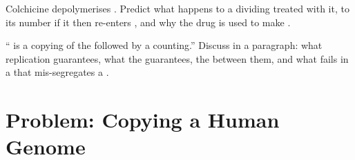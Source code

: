 \begin{exercise}[$\star\star\star$]\label{exo:b1:replication-mitosis:11}
Colchicine depolymerises . Predict what happens to a
dividing  treated with it, to its  number if it then
re-enters , and why the drug is used to make .
\end{exercise}

\begin{exercise}[$\star\star\star$]\label{exo:b1:replication-mitosis:12}
`` is a copying of the  followed by a counting.'' Discuss
in a paragraph: what replication guarantees, what the 
guarantees, the  between them, and what fails in a 
that mis-segregates a .
\end{exercise}

\section{Problem: Copying a Human Genome}

